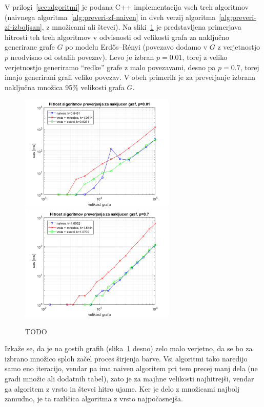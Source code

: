 \documentclass[12pt,a4paper,twoside]{article}
\theoremstyle{definition} %
\theoremstyle{plain} %
\numberwithin{equation}{section}  %
\begin{document}
V prilogi~\ref{sec:algoritmi} je podana C++ implementacija vseh treh algoritmov (naivnega algoritma~\ref{alg:preveri-zf-naiven} in dveh verzij algoritma~\ref{alg:preveri-zf-izboljsan}, z množicami ali števci). Na sliki~\ref{fig:primerjava-check-random-graf} je predstavljena primerjava hitrosti teh treh algoritmov v odvisnosti od velikosti grafa za naključno generirane grafe $G$ po modelu Erdős–Rényi (povezavo dodamo v $G$ z verjetnostjo $p$ neodvisno od ostalih povezav). Levo je izbran $p=0.01$, torej z veliko verjetnostjo generiramo ``redke'' grafe z malo povezavami, desno pa $p=0.7$, torej imajo generirani grafi veliko povezav.
V obeh primerih je za preverjanje izbrana naključna množica 95\% velikosti grafa $G$.
\begin{figure}[h]
    \centering
    \includegraphics[width=210pt]{koda/results/plots/random_sparse.png}
    \includegraphics[width=210pt]{koda/results/plots/random_dense.png}
    \caption{TODO}
    \label{fig:primerjava-check-random-graf}
\end{figure}

Izkaže se, da je na gostih grafih (slika~\ref{fig:primerjava-check-random-graf} desno) zelo malo verjetno, da se bo za izbrano množico sploh začel proces širjenja barve. Vsi algoritmi tako naredijo samo eno iteracijo, vendar pa ima naiven algoritem pri tem precej manj dela (ne gradi množic ali dodatnih tabel), zato je za majhne velikosti najhitrejši, vendar ga algoritem z vrsto in števci hitro ujame. Ker je delo z množicami najbolj zamudno, je ta različica algoritma z vrsto najpočasnejša.
\end{document}
